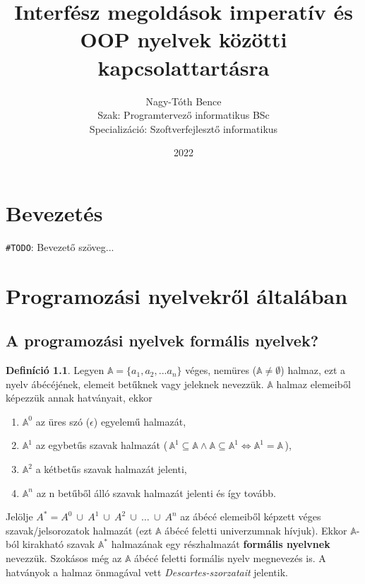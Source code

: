 \documentclass[tocnopagenum]{thesis-ekf}
\theoremstyle{definition}
\newtheorem{definicio}[tetel]{Definíció}
\theoremstyle{remark}
\begin{document}
	\title{Interfész megoldások imperatív és OOP nyelvek közötti kapcsolattartásra}
	\author{Nagy-Tóth Bence\\Szak: Programtervező informatikus BSc\\Specializáció: Szoftverfejlesztő informatikus}
	\date{2022}
	\maketitle
	\tableofcontents
	
	\chapter*{Bevezetés}
	\verb*|#TODO|: Bevezető szöveg...
	
	\chapter{Programozási nyelvekről általában}
	\section{A programozási nyelvek formális nyelvek?}
	\begin{definicio}
		Legyen $\mathbb{A} = \{a_1, a_2, ... a_n\}$ véges, nemüres ($ \mathbb{A} \neq \emptyset$) halmaz, ezt a nyelv ábécéjének, elemeit betűknek vagy jeleknek nevezzük. $\mathbb{A}$ halmaz elemeiből képezzük annak hatványait, ekkor 
		\begin{enumerate}
			\item $\mathbb{A} ^ {0}$ az üres szó ($\epsilon$) egyelemű halmazát, 
			\item $\mathbb{A} ^ {1} $ az egybetűs szavak halmazát (\,$\mathbb{A}^{1}\subseteq\mathbb{A}\wedge\mathbb{A}\subseteq\mathbb{A}^{1} \iff \mathbb{A}^{1}=\mathbb{A}$\,), 
			\item $\mathbb{A}^{2}$ a kétbetűs szavak halmazát jelenti, 
			\item $\mathbb{A}^{n}$ az n betűből álló szavak halmazát jelenti és így tovább.
		\end{enumerate}
	Jelölje $A^{*}=A^{0}\ \cup\ A^{1}\ \cup\ A^{2}\ \cup\ \dots\ \cup\  A^{n}$ az ábécé elemeiből képzett véges szavak/jelsorozatok halmazát (ezt $\mathbb{A}$ ábécé feletti univerzumnak hívjuk). Ekkor  $\mathbb{A}$-ból kirakható szavak $\mathbb{A}^{*}$ halmazának egy részhalmazát \textbf{formális nyelvnek} nevezzük. Szokásos még az $\mathbb{A}$ ábécé feletti formális nyelv megnevezés is. A hatványok a halmaz önmagával vett \emph{Descartes-szorzatait} jelentik.
	\cite{formnyelvek}
	\end{definicio}
	
\end{document}
